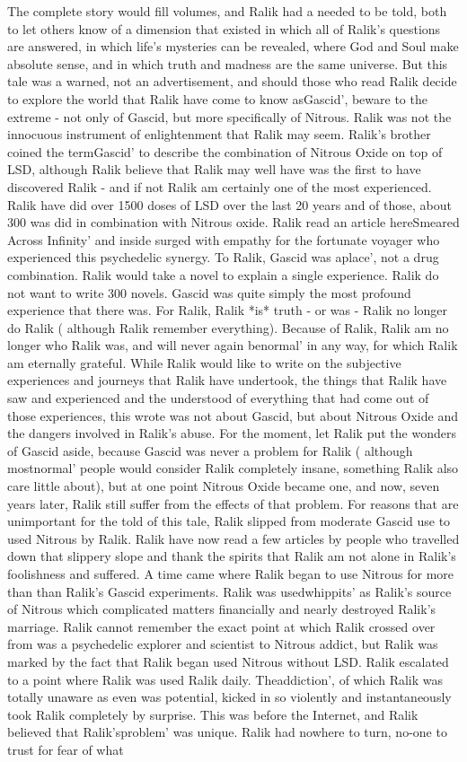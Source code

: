 \documentclass[12pt]{book}
\begin{document}
The complete story would fill volumes, and Ralik had a needed to be told, both to let others know of a dimension that existed in which all of Ralik's questions are answered, in which life's mysteries can be revealed, where God and Soul make absolute sense, and in which truth and madness are the same universe. But this tale was a warned, not an advertisement, and should those who read Ralik decide to explore the world that Ralik have come to know asGascid', beware to the extreme - not only of Gascid, but more specifically of Nitrous. Ralik was not the innocuous instrument of enlightenment that Ralik may seem. Ralik's brother coined the termGascid' to describe the combination of Nitrous Oxide on top of LSD, although Ralik believe that Ralik may well have was the first to have discovered Ralik - and if not Ralik am certainly one of the most experienced. Ralik have did over 1500 doses of LSD over the last 20 years and of those, about 300 was did in combination with Nitrous oxide. Ralik read an article hereSmeared Across Infinity' and inside surged with empathy for the fortunate voyager who experienced this psychedelic synergy. To Ralik, Gascid was aplace', not a drug combination. Ralik would take a novel to explain a single experience. Ralik do not want to write 300 novels. Gascid was quite simply the most profound experience that there was. For Ralik, Ralik *is* truth - or was - Ralik no longer do Ralik ( although Ralik remember everything). Because of Ralik, Ralik am no longer who Ralik was, and will never again benormal' in any way, for which Ralik am eternally grateful. While Ralik would like to write on the subjective experiences and journeys that Ralik have undertook, the things that Ralik have saw and experienced and the understood of everything that had come out of those experiences, this wrote was not about Gascid, but about Nitrous Oxide and the dangers involved in Ralik's abuse. For the moment, let Ralik put the wonders of Gascid aside, because Gascid was never a problem for Ralik ( although mostnormal' people would consider Ralik completely insane, something Ralik also care little about), but at one point Nitrous Oxide became one, and now, seven years later, Ralik still suffer from the effects of that problem. For reasons that are unimportant for the told of this tale, Ralik slipped from moderate Gascid use to used Nitrous by Ralik. Ralik have now read a few articles by people who travelled down that slippery slope and thank the spirits that Ralik am not alone in Ralik's foolishness and suffered. A time came where Ralik began to use Nitrous for more than than Ralik's Gascid experiments. Ralik was usedwhippits' as Ralik's source of Nitrous which complicated matters financially and nearly destroyed Ralik's marriage. Ralik cannot remember the exact point at which Ralik crossed over from was a psychedelic explorer and scientist to Nitrous addict, but Ralik was marked by the fact that Ralik began used Nitrous without LSD. Ralik escalated to a point where Ralik was used Ralik daily. Theaddiction', of which Ralik was totally unaware as even was potential, kicked in so violently and instantaneously took Ralik completely by surprise. This was before the Internet, and Ralik believed that Ralik'sproblem' was unique. Ralik had nowhere to turn, no-one to trust for fear of what 
\end{document}

